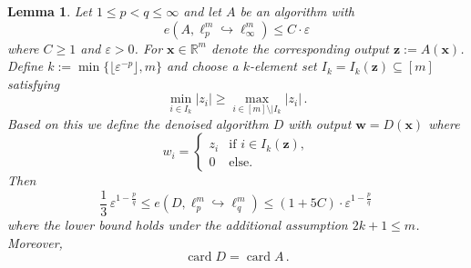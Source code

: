 \documentclass[12pt]{article}
\theoremstyle{plain}
\newtheorem{lemma}[theorem]{Lemma}
\theoremstyle{definition}
\DeclareMathOperator{\card}{card}
\newcommand{\eps}{\varepsilon}
\newcommand{\embed}{\hookrightarrow}
\renewcommand{\vec}{\boldsymbol}
\newcommand{\R}{{\mathbb R}}
\begin{document}
\begin{lemma}\label{lem:denoising}
    Let $1 \leq p < q \leq \infty$ and let $A$ be an algorithm with
    \begin{equation*}
       e(A,\ell_p^m \embed \ell_\infty^m) \leq C \cdot \eps
    \end{equation*}
    where $C \geq 1$ and $\eps > 0$.
    For $\vec{x} \in \R^m$ denote the corresponding output $\vec{z} := A(\vec{x})$.
    Define $k := \min\{\lfloor \eps^{-p} \rfloor, m\}$
    and choose a $k$-element set $I_k = I_k(\vec{z}) \subseteq [m]$ satisfying
    \begin{equation*}
        \min_{i \in I_k} |z_i| \geq \max_{i \in [m]\setminus |I_k} |z_i|\,.
    \end{equation*}
    Based on this we define the denoised algorithm $D$ with output $\vec{w} = D(\vec{x})$ where
    \begin{equation*}
        w_i = \begin{cases}
            z_i &\text{if } i \in I_k(\vec{z}),\\
            0 &\text{else.}
        \end{cases}
    \end{equation*}
    Then
    \begin{equation*}
        \textstyle \frac{1}{3} \, \eps^{1 - \frac{p}{q}}
            \leq  e(D,\ell_p^m \embed \ell_q^m)
            \leq (1 + 5C) \cdot \eps^{1-\frac{p}{q}} \,
    \end{equation*}
    where the lower bound holds under the additional assumption $2k+1 \leq m$.
    Moreover,
    \begin{equation*}
        \card D = \card A \,.
    \end{equation*}
\end{lemma}
\end{document}

